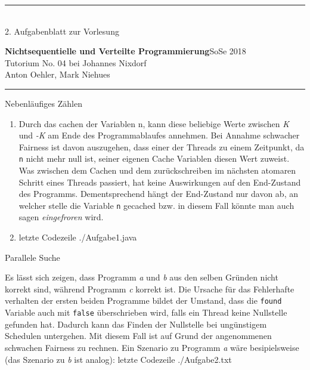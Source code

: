 \documentclass[a4paper,twoside,12pt]{article}
\newcommand{\ZETTELNUMMER}{2}
\newcounter{AUFGNR}
\newcommand{\AUFGABE}[2]{\vspace{0.3cm}\item[Aufgabe~\arabic{AUFGNR}]\stepcounter{AUFGNR} #1\hfill\emph{#2}}
\begin{document}
\pagestyle{empty}
\hrule\medskip
\rule{0ex}{0ex}\\[-1ex]
\ZETTELNUMMER. Aufgabenblatt zur Vorlesung

\smallskip
\noindent
\large
\textbf{Nichtsequentielle und Verteilte Programmierung}\hfill SoSe
2018 \\[0.5ex]
Tutorium No. 04 bei Johannes Nixdorf\\[0.5ex]

\normalsize
Anton Oehler, Mark Niehues

\medskip\hrule

\begin{description}
\AUFGABE{Nebenläufiges Zählen}{}
\begin{enumerate}
\item Durch das cachen der Variablen n, kann diese beliebige Werte zwischen \textit{K} und \textit{-K} am Ende des Programmablaufes annehmen. Bei Annahme schwacher Fairness ist davon auszugehen, dass einer der Threads zu einem Zeitpunkt, da \texttt{n} nicht mehr null ist, seiner eigenen Cache Variablen diesen Wert zuweist. Was zwischen dem Cachen und dem zurückschreiben im nächsten atomaren Schritt eines Threads passiert, hat keine Auswirkungen auf den End-Zustand des Programms. Dementsprechend hängt der End-Zustand nur davon ab, an welcher stelle die Variable \texttt{n} gecached bzw. in diesem Fall könnte man auch sagen \textit{eingefroren} wird.

\item  letzte Codezeile
{./Aufgabe1.java}

\end{enumerate}

\AUFGABE{Parallele Suche}{}

Es lässt sich zeigen, dass Programm \textit{a} und \textit{b} aus den selben Gründen nicht korrekt sind, während Programm \textit{c} korrekt ist. Die Ursache für das Fehlerhafte verhalten der ersten beiden Programme bildet der Umstand, dass die \texttt{found} Variable auch mit \texttt{false} überschrieben wird, falls ein Thread keine Nullstelle gefunden hat. Dadurch kann das Finden der Nullstelle bei ungünstigem Schedulen untergehen. Mit diesem Fall ist auf Grund der angenommenen schwachen Fairness zu rechnen. Ein Szenario zu Programm \textit{a} wäre besipielsweise (das Szenario zu \textit{b} ist analog):
 letzte Codezeile
{./Aufgabe2.txt}


\end{description}
\end{document}
